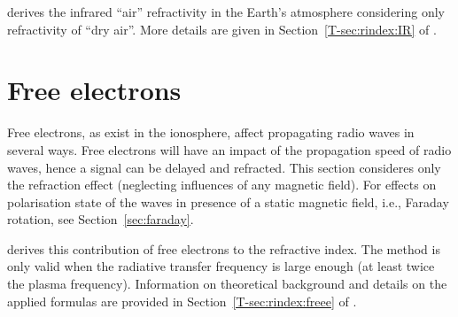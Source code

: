  derives the infrared ``air'' refractivity in the
Earth's atmosphere considering only refractivity of ``dry air''. More details are given in
Section~\ref{T-sec:rindex:IR} of \theory.

\section{Free electrons}
 \label{sec:rindex:freee}
%
Free electrons, as exist in the ionosphere, affect propagating radio waves
in several ways. Free electrons will have an impact of the propagation speed of
radio waves, hence a signal can be delayed and refracted. This section
consideres only the refraction effect (neglecting influences of any magnetic
field). For effects on polarisation state of the
waves in presence of a static magnetic field, i.e., Faraday rotation, see
Section~\ref{sec:faraday}.

 derives this contribution of free electrons
to the refractive index. The method is only valid when the radiative transfer
frequency is large enough (at least twice the plasma frequency).
Information on theoretical background and details on the applied formulas are
provided in Section~\ref{T-sec:rindex:freee} of \theory.


